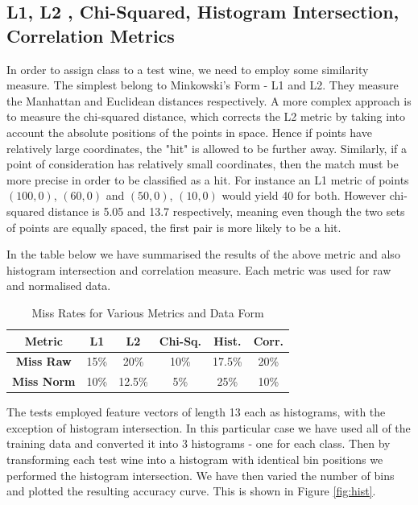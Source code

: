 \documentclass[10pt,twocolumn,letterpaper]{article}
\begin{document}
\subsection{L1, L2 , Chi-Squared, Histogram Intersection, Correlation Metrics}

In order to assign class to a test wine, we need to employ some similarity measure. The simplest belong to Minkowski's Form - L1 and L2. They measure the Manhattan and Euclidean distances respectively. A more complex approach is to measure the chi-squared distance, which corrects the L2 metric by taking into account the absolute positions of the points in space. Hence if points have relatively large coordinates, the "hit" is allowed to be further away. Similarly, if a point of consideration has relatively small coordinates, then the match must be more precise in order to be classified as a hit. For instance an L1 metric of points $(100,0)$, $(60,0)$ and $(50,0)$, $(10,0)$ would yield 40 for both. However chi-squared distance is 5.05 and 13.7 respectively, meaning even though the two sets of points are equally spaced, the first pair is more likely to be a hit.

In the table below we have summarised the results of the above metric and also histogram intersection and correlation measure. Each metric was used for raw and normalised data.

\begin{table}[H]
\caption{Miss Rates for Various Metrics and Data Form \label{tab:MissMetric}}
\small
\begin{center}
\begin{tabular}{|c| c c c c c|}
\hline
\bf Metric & L1 & L2 & Chi-Sq. &  Hist. & Corr. \\ [0.5ex]
\hline
\bf Miss Raw & 15\% &20\%  & 10\% & 17.5\% & 20\% \\ [0.5ex]
\hline
\bf Miss Norm & 10\% & 12.5\% & 5\% & 25\% & 10\% \\ [0.5ex]
\hline
\end{tabular}
\end{center}
\end{table}

\vspace{-5mm}

The tests employed feature vectors of length 13 each as histograms, with the exception of histogram intersection. In this particular case we have used all of the training data and converted it into 3 histograms - one for each class. Then by transforming each test wine into a histogram with identical bin positions we performed the histogram intersection. We have then varied the number of bins and plotted the resulting accuracy curve. This is shown in Figure \ref{fig:hist}.
\end{document}

